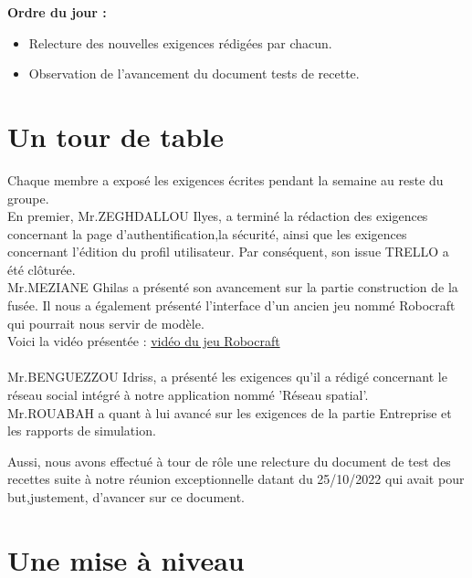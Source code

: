 \documentclass[a4paper, 12pt]{article}
\begin{document}
\textbf{Ordre du jour :}
 \begin{itemize}
     \item Relecture des nouvelles exigences rédigées par chacun. 
     \item Observation de l'avancement du document tests de recette.
 \end{itemize}


\section{Un tour de table}

Chaque membre a exposé les exigences écrites pendant la semaine au reste du groupe. \\

En premier, Mr.ZEGHDALLOU Ilyes, a terminé la rédaction des exigences concernant la
page d’authentification,la sécurité, ainsi que les exigences concernant l'édition du profil utilisateur. Par conséquent, son issue TRELLO a été clôturée. \\

Mr.MEZIANE Ghilas a présenté son avancement sur la partie construction de la fusée. Il nous a également présenté l'interface d'un ancien jeu nommé Robocraft qui pourrait nous servir de modèle. \\ 

Voici la vidéo présentée : 
\href{https://www.youtube.com/watch?v=dA4f3Skk01o&ab_channel=Robocraft2}{vidéo du jeu Robocraft}
\\ \\
Mr.BENGUEZZOU Idriss, a présenté les exigences qu'il a rédigé concernant le réseau social intégré à notre application nommé 'Réseau spatial'.
\\

Mr.ROUABAH a quant à lui avancé sur les exigences de la partie Entreprise et les rapports de simulation.

Aussi, nous avons effectué à tour de rôle une relecture du document de test des recettes suite à notre réunion exceptionnelle datant du 25/10/2022 qui avait pour but,justement, d'avancer sur ce document.
\newpage
\section{Une mise à niveau}
\end{document}
